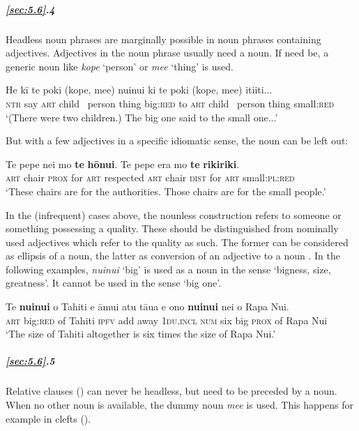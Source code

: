 \subparagraph{\ref{sec:5.6}.4} Headless noun phrases are marginally possible in noun phrases containing adjectives. Adjectives in the noun phrase usually need a noun. If need be, a generic noun like \textit{kope} ‘person’ or \textit{me{\ꞌ}e} ‘thing’ is used.

\ea\label{ex:5.104}
\gll He kī te poki (kope, me{\ꞌ}e) nuinui ki te poki (kope, me{\ꞌ}e) {\ꞌ}iti{\ꞌ}iti... \\
\textsc{ntr} say \textsc{art} child ~person thing big:\textsc{red} to \textsc{art} child ~person thing small:\textsc{red} \\

\glt
‘(There were two children.) The big one said to the small one...’ \textstyleExampleref{[Notes]}
\z

But with a few adjectives in a specific idiomatic sense, the noun can be left out:

\ea\label{ex:5.105}
\gll Te pepe nei mo \textbf{te} \textbf{hōnui}. Te pepe era mo \textbf{te} \textbf{rikiriki}. \\
\textsc{art} chair \textsc{prox} for \textsc{art} respected \textsc{art} chair \textsc{dist} for \textsc{art} small:\textsc{pl}:\textsc{red} \\

\glt
‘These chairs are for the authorities. Those chairs are for the small people.’ \textstyleExampleref{[Notes]}
\z

In the (infrequent) cases above, the nounless construction refers to someone or something possessing a quality. These should be distinguished from nominally used adjectives which refer to the quality as such. The former can be considered as ellipsis of a noun, the latter as conversion of an adjective to a noun \citep[96]{Bhat1994}. In the following examples, \textit{nuinui} ‘big’ is used as a noun in the sense ‘bigness, size, greatness’. It cannot be used in the sense ‘big one’. 

\ea\label{ex:5.106}
\gll Te \textbf{nuinui} o Tahiti e {\ꞌ}āmui atu tāua e ono \textbf{nuinui} nei o Rapa Nui. \\
\textsc{art} big:\textsc{red} of Tahiti \textsc{ipfv} add away \textsc{1du.incl} \textsc{num} six big \textsc{prox} of Rapa Nui \\

\glt 
‘The size of Tahiti altogether is six times the size of Rapa Nui.’ \textstyleExampleref{[R348.003]} 
\z

\subparagraph{\ref{sec:5.6}.5} Relative clauses () can never be headless, but need to be preceded by a noun. When no other noun is available, the dummy noun \textit{me{\ꞌ}e} is used. This happens for example in clefts ().

